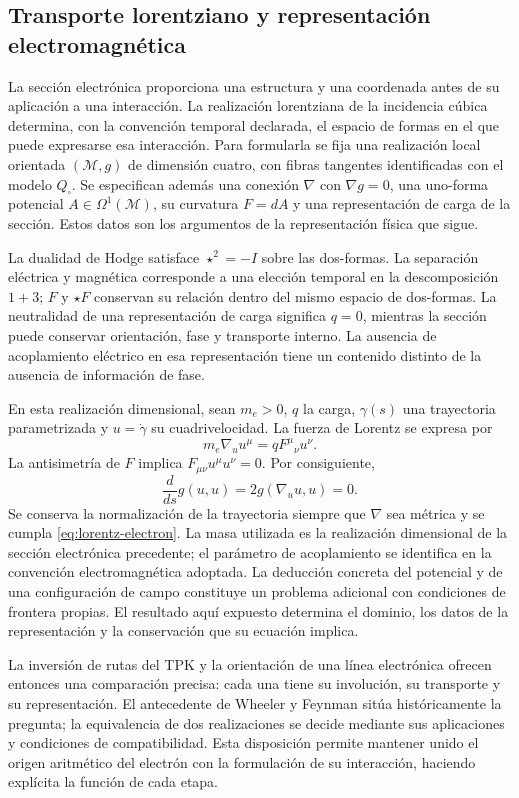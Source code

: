\newpage
\subsection{Transporte lorentziano y representación electromagnética}

La sección electrónica proporciona una estructura y una coordenada
antes de su aplicación a una interacción. La realización lorentziana
de la incidencia cúbica determina, con la convención temporal declarada,
el espacio de formas en el que puede expresarse esa interacción.
Para formularla se fija una realización local orientada \((\mathcal M,g)\)
de dimensión cuatro, con fibras tangentes identificadas con el modelo
\(Q_\square\). Se especifican además una conexión \(\nabla\) con
\(\nabla g=0\), una uno-forma potencial \(A\in\Omega^1(\mathcal M)\),
su curvatura \(F=dA\) y una representación de carga de la sección.
Estos datos son los argumentos de la representación física que sigue.

La dualidad de Hodge satisface \(\star^2=-I\) sobre las dos-formas.
La separación eléctrica y magnética corresponde a una elección temporal
en la descomposición \(1+3\); \(F\) y \(\star F\) conservan su
relación dentro del mismo espacio de dos-formas. La neutralidad de una
representación de carga significa \(q=0\), mientras la sección puede
conservar orientación, fase y transporte interno. La ausencia de
acoplamiento eléctrico en esa representación tiene un contenido distinto
de la ausencia de información de fase.

En esta realización dimensional, sean \(m_e>0\), \(q\) la carga,
\(\gamma(s)\) una trayectoria parametrizada y \(u=\dot\gamma\)
su cuadrivelocidad. La fuerza de Lorentz se expresa por
\begin{equation}
 m_e\nabla_u u^\mu=qF^\mu{}_{\nu}u^\nu.
 \label{eq:lorentz-electron}
\end{equation}
La antisimetría de \(F\) implica
\(F_{\mu\nu}u^\mu u^\nu=0\). Por consiguiente,
\[
 \frac{d}{ds}g(u,u)=2g(\nabla_u u,u)=0.
\]
Se conserva la normalización de la trayectoria siempre que \(\nabla\)
sea métrica y se cumpla \eqref{eq:lorentz-electron}. La masa utilizada
es la realización dimensional de la sección electrónica precedente;
el parámetro de acoplamiento se identifica en la convención electromagnética
adoptada. La deducción concreta del potencial y de una configuración
de campo constituye un problema adicional con condiciones de frontera
propias. El resultado aquí expuesto determina el dominio, los datos
de la representación y la conservación que su ecuación implica.

La inversión de rutas del TPK y la orientación de una línea electrónica
ofrecen entonces una comparación precisa: cada una tiene su involución,
su transporte y su representación. El antecedente de Wheeler y Feynman
sitúa históricamente la pregunta; la equivalencia de dos realizaciones
se decide mediante sus aplicaciones y condiciones de compatibilidad.
Esta disposición permite mantener unido el origen aritmético del electrón
con la formulación de su interacción, haciendo explícita la función
de cada etapa.
